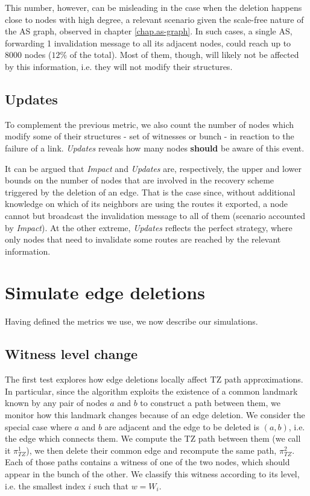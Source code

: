 \documentclass[a4paper,11pt,oneside]{report}
\begin{document}
This number, however, can be misleading in the case when the deletion happens close to nodes with high degree, a relevant scenario given the scale-free nature of the AS graph, observed in chapter \ref{chap.as-graph}. In such cases, a single AS, forwarding 1 invalidation message to all its adjacent nodes, could reach up to 8000 nodes ($12\%$ of the total). Most of them, though, will likely not be affected by this information, i.e. they will not modify their structures.

\subsection{Updates}
To complement the previous metric, we also count the number of nodes which modify some of their structures - set of witnesses or bunch - in reaction to the failure of a link. \textit{Updates} reveals how many nodes \textbf{should} be aware of this event.

\bigskip
It can be argued that \textit{Impact} and \textit{Updates} are, respectively, the upper and lower bounds on the number of nodes that are involved in the recovery scheme triggered by the deletion of an edge. That is the case since, without additional knowledge on which of its neighbors are using the routes it exported, a node cannot but broadcast the invalidation message to all of them (scenario accounted by \textit{Impact}). At the other extreme, \textit{Updates} reflects the perfect strategy, where only nodes that need to invalidate some routes are reached by the relevant information.

\section{Simulate edge deletions}
Having defined the metrics we use, we now describe our simulations. 

\subsection{Witness level change}
The first test explores how edge deletions locally affect TZ path approximations.  In particular, since the algorithm exploits the existence of a common landmark known by any pair of nodes $a$ and $b$ to construct a path between them, we monitor how this landmark changes because of an edge deletion. We consider the special case where $a$ and $b$ are adjacent and the edge to be deleted is $(a, b)$, i.e. the edge which connects them. We compute the TZ path between them (we call it $\pi_{TZ}^1$), we then delete their common edge and recompute the same path, $\pi_{TZ}^2$. Each of those paths contains a witness of one of the two nodes, which should appear in the bunch of the other. We classify this witness according to its level, i.e. the smallest index $i$ such that $w = W_i$.
\end{document}
